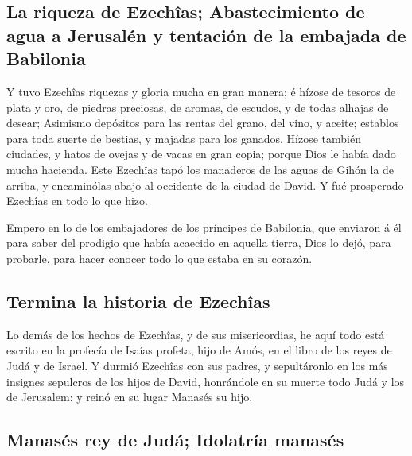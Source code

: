 \hypertarget{la-riqueza-de-ezechuxeeas-abastecimiento-de-agua-a-jerusaluxe9n-y-tentaciuxf3n-de-la-embajada-de-babilonia}{%
\subsection{La riqueza de Ezechîas; Abastecimiento de agua a Jerusalén y
tentación de la embajada de
Babilonia}\label{la-riqueza-de-ezechuxeeas-abastecimiento-de-agua-a-jerusaluxe9n-y-tentaciuxf3n-de-la-embajada-de-babilonia}}

 Y tuvo Ezechîas riquezas y gloria mucha en gran manera; é
hízose de tesoros de plata y oro, de piedras preciosas, de aromas, de
escudos, y de todas alhajas de desear;  Asimismo depósitos
para las rentas del grano, del vino, y aceite; establos para toda suerte
de bestias, y majadas para los ganados.  Hízose también
ciudades, y hatos de ovejas y de vacas en gran copia; porque Dios le
había dado mucha hacienda.  Este Ezechîas tapó los
manaderos de las aguas de Gihón la de arriba, y encaminólas abajo al
occidente de la ciudad de David. Y fué prosperado Ezechîas en todo lo
que hizo.

 Empero en lo de los embajadores de los príncipes de
Babilonia, que enviaron á él para saber del prodigio que había acaecido
en aquella tierra, Dios lo dejó, para probarle, para hacer conocer todo
lo que estaba en su corazón.

\hypertarget{termina-la-historia-de-ezechuxeeas}{%
\subsection{Termina la historia de
Ezechîas}\label{termina-la-historia-de-ezechuxeeas}}

 Lo demás de los hechos de Ezechîas, y de sus
misericordias, he aquí todo está escrito en la profecía de Isaías
profeta, hijo de Amós, en el libro de los reyes de Judá y de Israel.
 Y durmió Ezechîas con sus padres, y sepultáronlo en los
más insignes sepulcros de los hijos de David, honrándole en su muerte
todo Judá y los de Jerusalem: y reinó en su lugar Manasés su hijo.

\hypertarget{manasuxe9s-rey-de-juduxe1-idolatruxeda-manasuxe9s}{%
\subsection{Manasés rey de Judá; Idolatría
manasés}\label{manasuxe9s-rey-de-juduxe1-idolatruxeda-manasuxe9s}}

